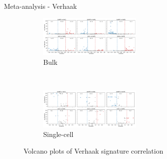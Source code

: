\documentclass[aspectratio=169,9pt]{beamer}
\begin{document}
    \begin{frame}{Meta-analysis - Verhaak}
        \begin{adjustwidth}{-5cm}{-5cm}
            \centering
            \begin{figure}\ContinuedFloat
                \centering
                \begin{subfigure}[c]{\textwidth}
                    \centering
                    \includegraphics[width=0.55\textwidth]{volcano_Bulk_Ver}
                    \caption{Bulk}
                \end{subfigure}
                \\
                \begin{subfigure}[c]{\textwidth}
                    \centering
                    \includegraphics[width=0.55\textwidth]{volcano_SC_Ver}
                    \caption{Single-cell}
                \end{subfigure}
                \caption{Volcano plots of Verhaak signature correlation}
            \end{figure}
        \end{adjustwidth}
    \end{frame}
\end{document}
